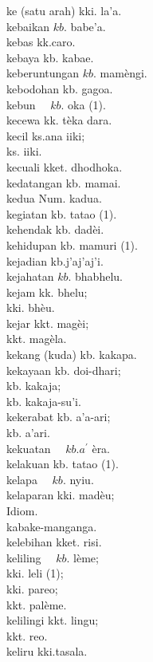 \documentclass[10pt]{article}
\begin{document}
ke (satu arah) kki. la'a.\\
kebaikan \(k b\). babe'a.\\
kebas kk.caro.\\
kebaya kb. kabae.\\
keberuntungan \(k b\). mamèngi.\\
kebodohan kb. gagoa.\\
kebun \(\quad k b\). oka (1).\\
kecewa kk. tèka dara.\\
kecil ks.ana iiki;\\
ks. iiki.\\
kecuali kket. dhodhoka.\\
kedatangan kb. mamai.\\
kedua Num. kadua.\\
kegiatan kb. tatao (1).\\
kehendak kb. dadèi.\\
kehidupan kb. mamuri (1).\\
kejadian kb.j'aj'aj'i.\\
kejahatan \(k b\). bhabhelu.\\
kejam kk. bhelu;\\
kki. bhèu.\\
kejar kkt. magèi;\\
kkt. magèla.\\
kekang (kuda) kb. kakapa.\\
kekayaan kb. doi-dhari;\\
kb. kakaja;\\
kb. kakaja-su'i.\\
kekerabat kb. a'a-ari;\\
kb. a'ari.\\
kekuatan \(\quad k b . a^{\prime}\) èra.\\
kelakuan kb. tatao (1).\\
kelapa \(\quad k b\). nyiu.\\
kelaparan kki. madèu;\\
Idiom.\\
kabake-manganga.\\
kelebihan kket. risi.\\
keliling \(\quad k b\). lème;\\
kki. leli (1);\\
kki. pareo;\\
kkt. palème.\\
kelilingi kkt. lingu;\\
kkt. reo.\\
keliru kki.tasala.\\
\end{document}
